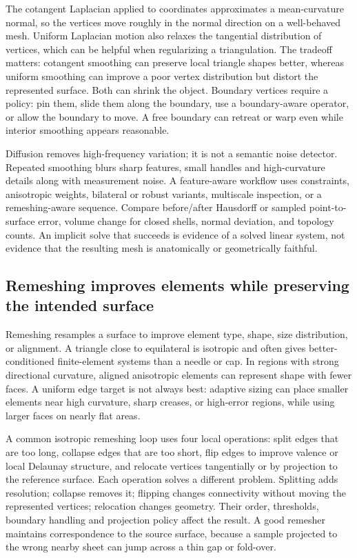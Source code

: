 The cotangent Laplacian applied to coordinates approximates a mean-curvature normal, so the vertices move roughly in the normal direction on a well-behaved mesh. Uniform Laplacian motion also relaxes the tangential distribution of vertices, which can be helpful when regularizing a triangulation. The tradeoff matters: cotangent smoothing can preserve local triangle shapes better, whereas uniform smoothing can improve a poor vertex distribution but distort the represented surface. Both can shrink the object. Boundary vertices require a policy: pin them, slide them along the boundary, use a boundary-aware operator, or allow the boundary to move. A free boundary can retreat or warp even while interior smoothing appears reasonable.

Diffusion removes high-frequency variation; it is not a semantic noise detector. Repeated smoothing blurs sharp features, small handles and high-curvature details along with measurement noise. A feature-aware workflow uses constraints, anisotropic weights, bilateral or robust variants, multiscale inspection, or a remeshing-aware sequence. Compare before/after Hausdorff or sampled point-to-surface error, volume change for closed shells, normal deviation, and topology counts. An implicit solve that succeeds is evidence of a solved linear system, not evidence that the resulting mesh is anatomically or geometrically faithful.

\subsection{Remeshing improves elements while preserving the intended surface}\label{03-visual-computing-i-ch002-remeshing-improves-elements-while-preserving-the-intended-surface}

\hypertarget{03-visual-computing-i-ch002-remeshing-improves-elements-while-preserving-the-intended-surface}{}

Remeshing resamples a surface to improve element type, shape, size distribution, or alignment. A triangle close to equilateral is isotropic and often gives better-conditioned finite-element systems than a needle or cap. In regions with strong directional curvature, aligned anisotropic elements can represent shape with fewer faces. A uniform edge target is not always best: adaptive sizing can place smaller elements near high curvature, sharp creases, or high-error regions, while using larger faces on nearly flat areas.

A common isotropic remeshing loop uses four local operations: split edges that are too long, collapse edges that are too short, flip edges to improve valence or local Delaunay structure, and relocate vertices tangentially or by projection to the reference surface. Each operation solves a different problem. Splitting adds resolution; collapse removes it; flipping changes connectivity without moving the represented vertices; relocation changes geometry. Their order, thresholds, boundary handling and projection policy affect the result. A good remesher maintains correspondence to the source surface, because a sample projected to the wrong nearby sheet can jump across a thin gap or fold-over.

